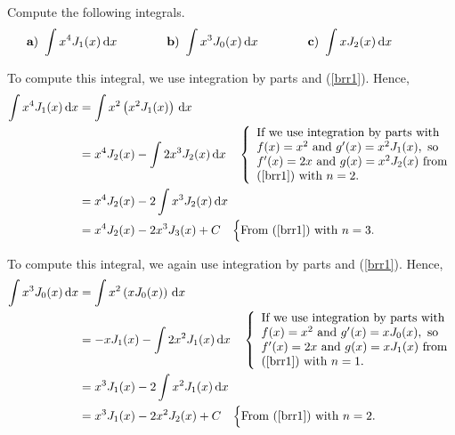 \begin{egg}
Compute the following integrals.               \label{ExBesselInt}
\[
\begin{array}{*{3}{l@{\hspace{0.5em}}l@{\hspace*{4em}}}}
\text{\bfseries a}) & \DS \int x^4 J_1(x) \dx{x} 
& \text{\bfseries b}) & \DS \int x^3 J_0(x) \dx{x}
& \text{\bfseries c}) & \DS \int x J_2(x) \dx{x}
\end{array}
\]

 To compute this integral, we use integration by parts and
(\ref{brr1}).  Hence,
\begin{align*}
\int x^4 J_1(x) \,\mathrm{d}{x}
&= \int x^2 \left( x^2 J_1(x) \right) \,\mathrm{d}{x} \\
&= x^4 J_2(x) - \int 2 x^3 J_2(x) \,\mathrm{d}{x}
\quad \left\{ 
\begin{array}{l}
\text{If we use integration by parts with} \\
f(x)=x^2 \text{ and } g'(x) = x^2 J_1(x), \text{ so} \\
f'(x) = 2x \text{ and } g(x) = x^2 J_2(x) \text{ from} \\
\text{(\ref{brr1}) with } n=2 .
\end{array} \right. \\
&= x^4 J_2(x) - 2 \int x^3 J_2(x) \,\mathrm{d}{x} \\
&= x^4 J_2(x) - 2 x^3 J_3(x) + C \quad \Big\{
\text{From (\ref{brr1}) with } n = 3 . 
\end{align*}

 To compute this integral, we again use integration by parts and
(\ref{brr1}).  Hence,
\begin{align*}
\int x^3 J_0(x) \,\mathrm{d}{x}
&= \int x^2  \left( x J_0(x)\right) \,\mathrm{d}{x} \\
&= -x J_1(x) -  \int 2 x^2 J_1(x) \,\mathrm{d}{x} \quad
\left\{
\begin{array}{l}
\text{If we use integration by parts with} \\
f(x)=x^2 \text{ and } g'(x) = x J_0(x), \text{ so} \\
f'(x) = 2x \text{ and } g(x) = x J_1(x) \text{ from} \\
\text{(\ref{brr1}) with } n=1 .
\end{array} \right. \\
&= x^3 J_1(x) - 2 \int x^2 J_1(x) \,\mathrm{d}{x} \\
&= x^3 J_1(x) - 2 x^2 J_2(x) + C \quad
\Big\{ \text{From (\ref{brr1}) with } n = 2 .
\end{align*}


\end{egg}
